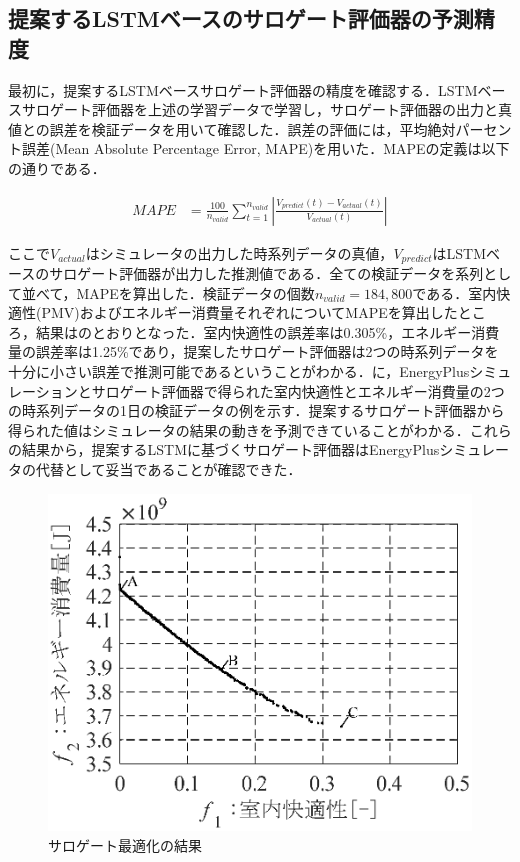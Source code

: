 \subsection{提案するLSTMベースのサロゲート評価器の予測精度}
最初に，提案するLSTMベースサロゲート評価器の精度を確認する．LSTMベースサロゲート評価器を上述の学習データで学習し，サロゲート評価器の出力と真値との誤差を検証データを用いて確認した．誤差の評価には，平均絶対パーセント誤差(Mean Absolute Percentage Error, MAPE)を用いた．MAPEの定義は以下の通りである．

\begin{align}
  \label{eq::surrogate_error_rate}
  MAPE & = \frac{100}{n_{valid}} \sum^{n_{valid}}_{t=1} |\frac{V_{predict}(t)-V_{actual}(t)}{V_{actual}(t)}|
\end{align}

ここで$V_{actual}$はシミュレータの出力した時系列データの真値，$V_{predict}$はLSTMベースのサロゲート評価器が出力した推測値である．全ての検証データを系列として並べて，MAPEを算出した．検証データの個数$n_{valid}=184,800$である．室内快適性(PMV)およびエネルギー消費量それぞれについてMAPEを算出したところ，結果はのとおりとなった．室内快適性の誤差率は0.305\%，エネルギー消費量の誤差率は1.25\%であり，提案したサロゲート評価器は2つの時系列データを十分に小さい誤差で推測可能であるということがわかる．に，EnergyPlusシミュレーションとサロゲート評価器で得られた室内快適性とエネルギー消費量の2つの時系列データの1日の検証データの例を示す．提案するサロゲート評価器から得られた値はシミュレータの結果の動きを予測できていることがわかる．これらの結果から，提案するLSTMに基づくサロゲート評価器はEnergyPlusシミュレータの代替として妥当であることが確認できた．

\begin{figure}[ht]
  \begin{center}
    \includegraphics[width=0.8\linewidth]{fig/surrogate_result_pareto.eps}
  \end{center}
  \caption{サロゲート最適化の結果}
  \label{fig::surrogate_result_pareto}
\end{figure}

